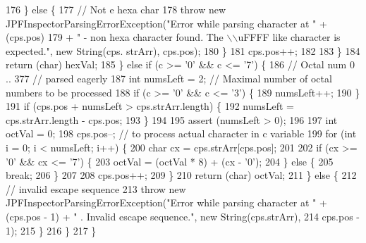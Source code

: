 \begin{DoxyCode}
176           \} \textcolor{keywordflow}{else} \{
177             \textcolor{comment}{// Not e hexa char}
178             \textcolor{keywordflow}{throw} \textcolor{keyword}{new} JPFInspectorParsingErrorException(\textcolor{stringliteral}{"Error while parsing character at "} + (cps.pos)
179                 + \textcolor{stringliteral}{" - non hexa character found. The \(\backslash\)\(\backslash\)uFFFF like character is expected."}, \textcolor{keyword}{new} String(cps.
      strArr), cps.pos);
180           \}
181           cps.pos++;
182 
183         \}
184         \textcolor{keywordflow}{return} (\textcolor{keywordtype}{char}) hexVal;
185       \} \textcolor{keywordflow}{else} \textcolor{keywordflow}{if} (c >= \textcolor{charliteral}{'0'} && c <= \textcolor{charliteral}{'7'}) \{
186         \textcolor{comment}{// Octal num 0 .. 377 // parsed eagerly}
187         \textcolor{keywordtype}{int} numsLeft = 2; \textcolor{comment}{// Maximal number of octal numbers to be processed}
188         \textcolor{keywordflow}{if} (c >= \textcolor{charliteral}{'0'} && c <= \textcolor{charliteral}{'3'}) \{
189           numsLeft++;
190         \}
191         \textcolor{keywordflow}{if} (cps.pos + numsLeft > cps.strArr.length) \{
192           numsLeft = cps.strArr.length - cps.pos;
193         \}
194 
195         assert (numsLeft > 0);
196 
197         \textcolor{keywordtype}{int} octVal = 0;
198         cps.pos--; \textcolor{comment}{// to process actual character in c variable}
199         \textcolor{keywordflow}{for} (\textcolor{keywordtype}{int} i = 0; i < numsLeft; i++) \{
200           \textcolor{keywordtype}{char} cx = cps.strArr[cps.pos];
201 
202           \textcolor{keywordflow}{if} (cx >= \textcolor{charliteral}{'0'} && cx <= \textcolor{charliteral}{'7'}) \{
203             octVal = (octVal * 8) + (cx - \textcolor{charliteral}{'0'});
204           \} \textcolor{keywordflow}{else} \{
205             \textcolor{keywordflow}{break};
206           \}
207 
208           cps.pos++;
209         \}
210         \textcolor{keywordflow}{return} (\textcolor{keywordtype}{char}) octVal;
211       \} \textcolor{keywordflow}{else} \{
212         \textcolor{comment}{// invalid escape sequence}
213         \textcolor{keywordflow}{throw} \textcolor{keyword}{new} JPFInspectorParsingErrorException(\textcolor{stringliteral}{"Error while parsing character at "} + (cps.pos - 1) + \textcolor{stringliteral}{"
      . Invalid escape sequence."}, \textcolor{keyword}{new} String(cps.strArr),
214             cps.pos - 1);
215       \}
216     \}
217   \}
\end{DoxyCode}
